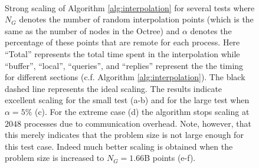 \begin{figure}[htbp]
\begin{center}
		\\
		 \hspace{0.5 in}
	\end{center}
	\caption{Strong scaling of Algorithm \ref{alg:interpolation} for several tests where $N_G$ denotes the number of random interpolation points (which is the same as the number of nodes in the Octree) and $\alpha$ denotes the percentage of these points that are remote for each process. Here ``Total'' represents the total time spent in the interpolation while ``buffer'', ``local'', ``queries'', and ``replies'' represent the the timing for different sections (c.f. Algorithm \ref{alg:interpolation}). The black dashed line represents the ideal scaling. The results indicate excellent scaling for the small test (a-b) and for the large test when $\alpha = 5\%$ (c). For the extreme case (d) the algorithm stops scaling at $2048$ processes due to communication overhead. Note, however, that this merely indicates that the problem size is not large enough for this test case. Indeed much better scaling is obtained when the problem size is increased to $N_G = 1.66$B points (e-f).}
	\label{fig:interpolation}
\end{figure}

